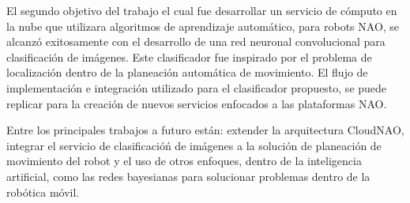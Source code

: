 El segundo objetivo del trabajo el cual fue desarrollar un servicio de cómputo en la nube que utilizara
algoritmos de aprendizaje automático, para robots NAO, se 
alcanzó exitosamente con el desarrollo
de una red neuronal convolucional para clasificación
de imágenes. Este clasificador fue inspirado
por el problema de localización dentro de la planeación 
automática de movimiento. El flujo de implementación e
integración utilizado para el clasificador 
propuesto, se puede replicar para la creación de nuevos servicios
enfocados a las plataformas NAO.

Entre los principales trabajos a futuro están:
extender la arquitectura
CloudNAO,
integrar el servicio de clasificacióń de imágenes
a la solución de planeación de movimiento del robot
y el uso de otros enfoques, dentro de la inteligencia
artificial, como las redes bayesianas para solucionar
problemas dentro de la robótica móvil.



